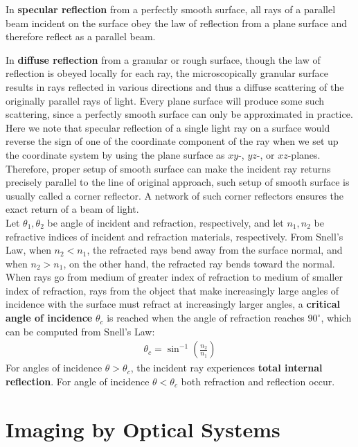 \documentclass[11pt]{book}
\theoremstyle{break}
\theoremstyle{break}
\begin{document}
 
In \textbf{specular reflection} from a perfectly smooth surface, all rays of a parallel beam incident on the surface obey the law of reflection from a plane surface and therefore reflect as a parallel beam.

In \textbf{diffuse reflection} from a granular or rough surface, though the law of reflection is obeyed locally for each ray, the microscopically granular surface results in rays reflected in various directions and thus a diffuse scattering of the originally parallel rays of light. Every plane surface will produce some such scattering, since a perfectly smooth surface can only be approximated in practice. \\

Here we note that specular reflection of a single light ray on a surface would reverse the sign of one of the coordinate component of the ray when we set up the coordinate system by using the plane surface as $xy$-, $yz$-, or $xz$-planes. Therefore, proper setup of smooth surface can make the incident ray returns precisely parallel to the line of original approach, such setup of smooth surface is usually called a corner reflector. A
network of such corner reflectors ensures the exact return of a beam of light.\\

Let $\theta_1,\theta_2$ be angle of incident and refraction, respectively, and let $n_1, n_2$ be refractive indices of incident and refraction materials, respectively. From Snell's Law, when $n_2<n_1$, the refracted rays bend away from the surface normal, and when $n_2>n_1$, on the other hand, the refracted ray bends toward the normal.\\

When rays go from medium of greater index of refraction to medium of smaller index of refraction, rays from the object that make increasingly large angles of incidence with the surface must refract at increasingly larger angles, a \textbf{critical angle of incidence} $\theta_c$ is reached when the angle of refraction reaches $90^\circ$, which can be computed from Snell's Law:
\begin{align}
\theta_c = \sin^{-1}\left( \frac{n_2}{n_1}\right)
\end{align}
For angles of incidence $\theta>\theta_c$, the incident ray experiences \textbf{total internal reflection}. For angle of incidence $\theta< \theta_c$ both refraction and reflection occur.


\newpage
\section[Imaging by Optical Systems]{\color{red}Imaging by Optical Systems\color{black}}
\end{document}
